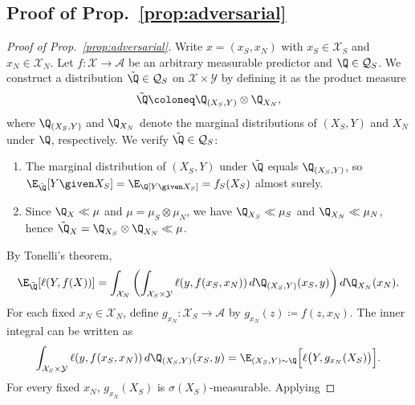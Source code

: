 
\subsection{Proof of Prop.~\ref{prop:adversarial}}
\label{app:adversarial}


\begin{proof}[Proof of Prop.~\ref{prop:adversarial}]
Write $x = (x_S, x_N)$ with $x_S \in \mathcal{X}_S$ and
$x_N \in \mathcal{X}_N$. Let $f\colon \mathcal{X} \to \mathcal{A}$ be
an arbitrary measurable predictor and $\Q \in \mathcal{Q}_S$. We construct a distribution $\tilde\Q \in \mathcal{Q}_S$ on $\mathcal{X} \times \mathcal{Y}$ by defining it as the product measure
$$
  \tilde\Q  \coloneq  \Q_{(X_S, Y)} \otimes \Q_{X_N},
$$
where $\Q_{(X_S, Y)}$ and $\Q_{X_N}$ denote the marginal distributions
of $(X_S, Y)$ and $X_N$ under $\Q$, respectively. We verify
$\tilde\Q \in \mathcal{Q}_S$:
\begin{enumerate}[label=(\roman*)]
  \item The marginal distribution of $(X_S, Y)$ under $\tilde\Q$ equals $\Q_{(X_S,Y)}$,
        so $\E_{\tilde\Q}[Y \given X_S] = \E_\Q[Y \given X_S]
        = f_S(X_S)$ almost surely.
  \item Since $\Q_X \ll \mu$ and $\mu = \mu_S \otimes \mu_N$, we have
        $\Q_{X_S} \ll \mu_S$ and $\Q_{X_N} \ll \mu_N$, hence
        $\tilde\Q_X = \Q_{X_S} \otimes \Q_{X_N} \ll \mu$.
\end{enumerate}
By Tonelli's theorem,
$$ \E_{\tilde\Q} [\ell(Y, f(X))] = \int_{\mathcal{X}_N} \left( \int_{\mathcal{X}_S \times \mathcal{Y}} \ell(y, f(x_S, x_N)) \, d\Q_{(X_S, Y)}(x_S, y) \right) d\Q_{X_N}(x_N). $$
For each fixed $x_N \in \mathcal{X}_N$, define $g_{x_N}: \mathcal{X}_S \to \mathcal{A}$ by $g_{x_N}(z) \coloneq f(z, x_N)$. The inner integral can be written as
$$\int_{\mathcal{X}_S \times \mathcal{Y}} \ell(y, f(x_S, x_N)) \, d\Q_{(X_S, Y)}(x_S, y) = \E_{(X_S, Y) \sim \Q} \Big[ \ell\big(Y, g_{x_N}(X_S)\big) \Big].$$
For every fixed $x_N$, $g_{x_N}(X_S)$ is $\sigma(X_S)$-measurable. Applying

\end{proof}
